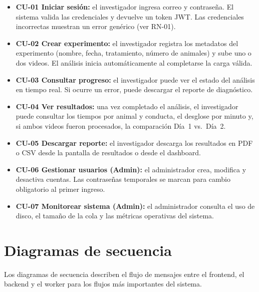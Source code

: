 \begin{itemize}
  \item \textbf{CU-01 Iniciar sesión:} el investigador ingresa correo y contraseña.
        El sistema valida las credenciales y devuelve un token JWT. Las credenciales
        incorrectas muestran un error genérico (ver RN-01).

  \item \textbf{CU-02 Crear experimento:} el investigador registra los metadatos del
        experimento (nombre, fecha, tratamiento, número de animales) y sube uno o
        dos videos. El análisis inicia automáticamente al completarse la carga válida.

  \item \textbf{CU-03 Consultar progreso:} el investigador puede ver el estado del
        análisis en tiempo real. Si ocurre un error, puede descargar el reporte de
        diagnóstico.

  \item \textbf{CU-04 Ver resultados:} una vez completado el análisis, el
        investigador puede consultar los tiempos por animal y conducta, el desglose
        por minuto y, si ambos videos fueron procesados, la comparación Día~1
        vs.\ Día~2.

  \item \textbf{CU-05 Descargar reporte:} el investigador descarga los resultados
        en PDF o CSV desde la pantalla de resultados o desde el dashboard.

  \item \textbf{CU-06 Gestionar usuarios (Admin):} el administrador crea, modifica
        y desactiva cuentas. Las contraseñas temporales se marcan para cambio
        obligatorio al primer ingreso.

  \item \textbf{CU-07 Monitorear sistema (Admin):} el administrador consulta el
        uso de disco, el tamaño de la cola y las métricas operativas del sistema.
\end{itemize}

\section{Diagramas de secuencia}

Los diagramas de secuencia describen el flujo de mensajes entre el frontend, el
backend y el worker para los flujos más importantes del sistema.

